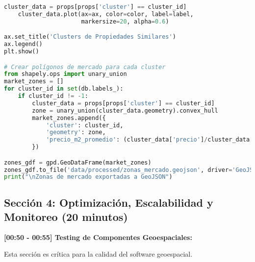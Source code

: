 \documentclass[11pt,a4paper]{article}
\begin{document}
\begin{lstlisting}[language=Python]
    cluster_data = props[props['cluster'] == cluster_id]
    cluster_data.plot(ax=ax, color=color, label=label, 
                      markersize=20, alpha=0.6)

ax.set_title('Clusters de Propiedades Similares')
ax.legend()
plt.show()

# Crear polígonos de mercado para cada cluster
from shapely.ops import unary_union
market_zones = []
for cluster_id in set(db.labels_):
    if cluster_id != -1:
        cluster_data = props[props['cluster'] == cluster_id]
        zone = unary_union(cluster_data.geometry).convex_hull
        market_zones.append({
            'cluster': cluster_id,
            'geometry': zone,
            'precio_m2_promedio': (cluster_data['precio']/cluster_data['m2']).mean()
        })

zones_gdf = gpd.GeoDataFrame(market_zones)
zones_gdf.to_file('data/processed/zonas_mercado.geojson', driver='GeoJSON')
print("\nZonas de mercado exportadas a GeoJSON")
\end{lstlisting}

\subsection{Sección 4: Optimización, Escalabilidad y Monitoreo (20 minutos)}

\textbf{[00:50 - 00:55] Testing de Componentes Geoespaciales:}

\begin{alertbox}
Esta sección es crítica para la calidad del software geoespacial.
\end{alertbox}
\end{document}
